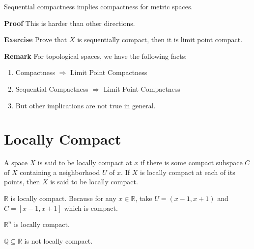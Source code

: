 \documentclass[main.tex]{subfiles}
\begin{document}
\begin{theorem}
    Sequential compactness implies compactness for metric spaces.
\end{theorem}
\par \noindent \textbf{Proof} This is harder than other directions. 


\par \noindent \textbf{Exercise} Prove that $X$ is sequentially compact, then it is limit point compact. 


\par \noindent \textbf{Remark} For topological spaces, we have the following facts: 

\begin{enumerate}
    \item Compactness $\Rightarrow$ Limit Point Compactness
    \item Sequential Compactness $\Rightarrow$ Limit Point Compactness 
    \item But other implications are not true in general.
\end{enumerate}



\section{Locally Compact} 

\begin{definition}
    A space $X$ is said to be locally compact at $x$ if there is some compact subspace $C$ of $X$ containing a neighborhood $U$ of $x$. If $X$ is locally compact at each of its points, then $X$ is said to be locally compact.
\end{definition}

\begin{example}
    $\mathbb{R}$ is locally compact. Because for any $x\in \mathbb{R}$, take $U = (x - 1, x + 1)$ and $C = [x - 1, x + 1]$ which is compact. 
\end{example}

\begin{example}
    $\mathbb{R}^n$ is locally compact. 
\end{example}

\begin{example}
    $\mathbb{Q} \subseteq \mathbb{R}$ is not locally compact.
\end{example}
\end{document}
